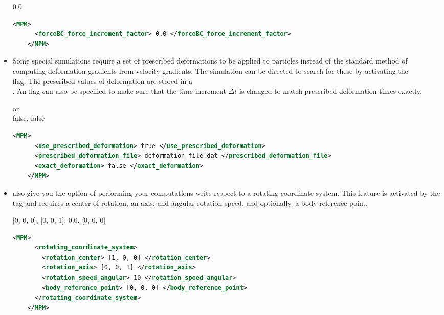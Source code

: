 \begin{itemize}
     0.0
    \begin{lstlisting}[language=XML]
    <MPM>
      <forceBC_force_increment_factor> 0.0 </forceBC_force_increment_factor>
    </MPM>
    \end{lstlisting}

  \item {} Some special simulations require a
    set of prescribed deformations to be applied to particles instead of the
    standard method of computing deformation gradients from velocity gradients.  
    The simulation can be directed to search for these by activating the\\
     flag.  The prescribed values of
    deformation are stored in a \\ .  An
     flag can also be specified to make sure that the
    time increment $\Delta t$ is changed to match prescribed deformation times
    exactly.

      or \\
     false, false
    \begin{lstlisting}[language=XML]
    <MPM>
      <use_prescribed_deformation> true </use_prescribed_deformation>
      <prescribed_deformation_file> deformation_file.dat </prescribed_deformation_file>
      <exact_deformation> false </exact_deformation>
    </MPM>
    \end{lstlisting}

  \item {} \Vaango also give you the option of
    performing your computations write respect to a rotating coordinate system.
    This feature is activated by the  tag
    and requires a center of rotation, an axis, and angular rotation speed, and
    optionally, a body reference point.

     [0, 0, 0], [0, 0, 1], 0.0, [0, 0, 0]
    \begin{lstlisting}[language=XML]
    <MPM>
      <rotating_coordinate_system>
        <rotation_center> [1, 0, 0] </rotation_center>
        <rotation_axis> [0, 0, 1] </rotation_axis>
        <rotation_speed_angular> 10 </rotation_speed_angular>
        <body_reference_point> [0, 0, 0] </body_reference_point>
      </rotating_coordinate_system>
    </MPM>
    \end{lstlisting}


\end{itemize}
